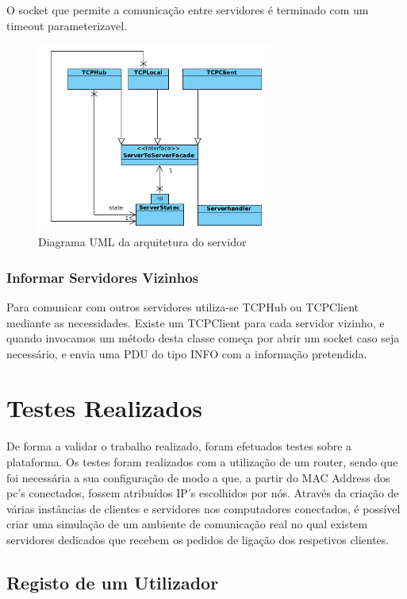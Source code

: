 \documentclass[runningheads,a4paper]{llncs}
\begin{document}
O socket que permite a comunicação entre servidores é terminado com um timeout parameterizavel.

\begin{figure}
\centering
\includegraphics[height=6.2cm]{facades.png}
\caption{Diagrama UML da arquitetura do servidor}
\label{fig:diagram-facades}
\end{figure}


\subsubsection{Informar Servidores Vizinhos}

Para comunicar com outros servidores utiliza-se TCPHub ou TCPClient mediante as necessidades.
Existe um TCPClient para cada servidor vizinho, e quando invocamos um método desta classe começa por abrir um socket caso seja necessário, e envia uma PDU do tipo INFO com a informação pretendida.

\section{Testes Realizados}

De forma a validar o trabalho realizado, foram efetuados testes sobre a plataforma. Os testes foram realizados com a utilização de um router, sendo que foi necessária a sua configuração de modo a que, a partir do MAC Address dos pc’s conectados, fossem atribuídos IP’s escolhidos por nós. Através da criação de várias instâncias de clientes e servidores nos computadores conectados, é possível criar uma simulação de um ambiente de comunicação real no qual existem servidores dedicados que recebem os pedidos de ligação dos respetivos clientes.

\subsection{Registo de um Utilizador}
\end{document}
